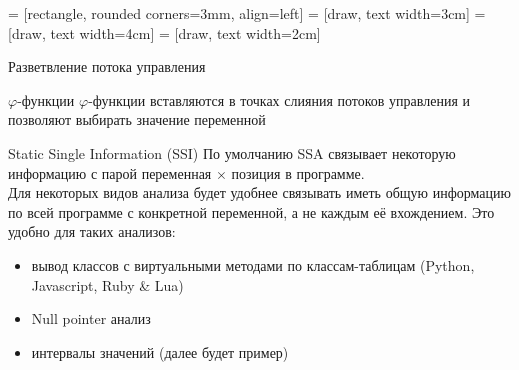 \documentclass[aspectratio=169
  , xcolor={svgnames}
  , hyperref={ colorlinks,citecolor=DeepPink4
             , linkcolor=DarkRed,urlcolor=DarkBlue}
  , russian
  ]{beamer}
\theoremstyle{exerciseStyle1}
\begin{document}
 = [rectangle, rounded corners=3mm, align=left]
 = [draw, text width=3cm]
 = [draw, text width=4cm]
 = [draw, text width=2cm]

\begin{frame}[fragile]{Разветвление потока управления}
\begin{minipage}[t]{0.48\linewidth}
\begin{figure}

\end{figure}
\end{minipage}\vspace{1em}

\end{frame}

\begin{frame}[fragile]{$\varphi$-функции}
$\varphi$-функции вставляются в точках слияния потоков управления и позволяют выбирать значение переменной

\begin{minipage}[t]{0.48\linewidth}
\begin{figure}

\end{figure}
\end{minipage}

\end{frame}


\begin{frame}[fragile]{Static Single Information (SSI)}
По умолчанию SSA связывает некоторую информацию с парой переменная $\times$ позиция в программе.\\

Для некоторых видов анализа будет удобнее связывать иметь общую информацию по всей программе с конкретной переменной, а не каждым её вхождением. Это удобно для таких анализов:
\begin{itemize}
\item вывод классов с виртуальными методами по классам-таблицам (Python, Javascript, Ruby \& Lua)
\item Null pointer анализ
\item интервалы значений (далее будет пример)
\end{itemize}
\end{frame}
\end{document}
